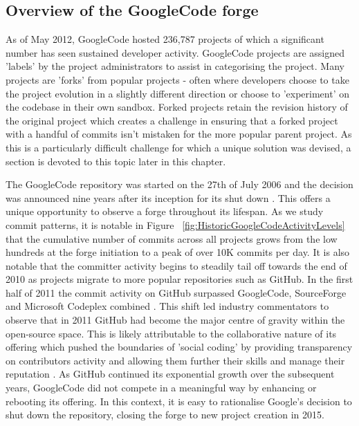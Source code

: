 \subsection{Overview of the GoogleCode forge}
As of May 2012, GoogleCode hosted 236,787 projects of which a significant number has seen sustained developer activity. GoogleCode projects are assigned 'labels' by the project administrators to assist in categorising the project. Many projects are 'forks' from popular projects - often where developers choose to take the project evolution in a slightly different direction or choose to 'experiment' on the codebase in their own sandbox. Forked projects retain the revision history of the original project which creates a challenge in ensuring that a forked project with a handful of commits isn't mistaken for the more popular parent project. As this is a particularly difficult challenge for which a unique solution was devised, a section is devoted to this topic later in this chapter.

The GoogleCode repository was started on the 27th of July 2006 \citep{shankland2006google} and the decision was announced nine years after its inception for its shut down \citep{dibona2006bidding}. This offers a unique opportunity to observe a forge throughout its lifespan. As we study commit patterns, it is notable in Figure ~\ref{fig:HistoricGoogleCodeActivityLevels} that the cumulative number of commits across all projects grows from the low hundreds at the forge initiation to a peak of over 10K commits per day. It is also notable that the committer activity begins to steadily tail off towards the end of 2010 as projects migrate to more popular repositories such as GitHub. In the first half of 2011 the commit activity on GitHub surpassed GoogleCode, SourceForge and Microsoft Codeplex combined \citep{redmonk2011}. This shift led industry commentators to observe that in 2011 GitHub had become the major centre of gravity within the open-source space. This is likely attributable to the collaborative nature of its offering which pushed the boundaries of 'social coding' by providing transparency on contributors activity and allowing them further their skills and manage their reputation \citep{dabbish2012social}. As GitHub continued its exponential growth over the subsequent years, GoogleCode did not compete in a meaningful way by enhancing or rebooting its offering. In this context, it is easy to rationalise Google's decision to shut down the repository, closing the forge to new project creation in 2015.
 
